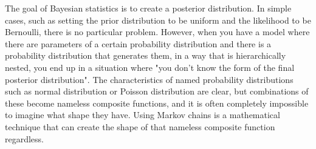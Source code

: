 \documentclass{ltjsarticle}
\begin{document}
The goal of Bayesian statistics is to create a posterior distribution. In simple cases, such as setting the prior distribution to be uniform and the likelihood to be Bernoulli, there is no particular problem. However, when you have a model where there are parameters of a certain probability distribution and there is a probability distribution that generates them, in a way that is hierarchically nested, you end up in a situation where "you don't know the form of the final posterior distribution". The characteristics of named probability distributions such as normal distribution or Poisson distribution are clear, but combinations of these become nameless composite functions, and it is often completely impossible to imagine what shape they have. Using Markov chains is a mathematical technique that can create the shape of that nameless composite function regardless.
\end{document}

